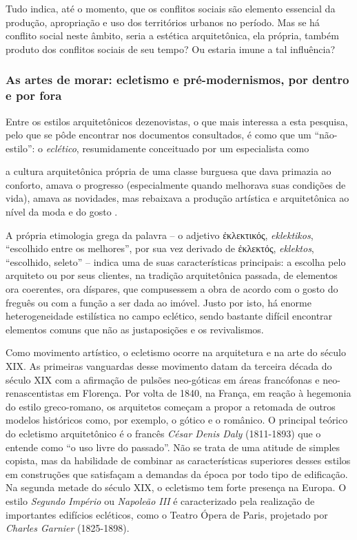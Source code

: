 Tudo indica, até o momento, que os conflitos sociais são elemento essencial da produção, apropriação e uso dos territórios urbanos no período. Mas se há conflito social neste âmbito, seria a estética arquitetônica, ela própria, também produto dos conflitos sociais de seu tempo? Ou estaria imune a tal influência?

\subsubsection{As artes de morar: ecletismo e pré-modernismos, por dentro e por fora}\label{subsec:armor}

Entre os estilos arquitetônicos dezenovistas, o que mais interessa a esta pesquisa, pelo que se pôde encontrar nos documentos consultados, é como que um ``não-estilo'': o \textit{eclético}, resumidamente conceituado por um especialista como

\begin{citacao}
a cultura arquitetônica própria de uma classe burguesa que dava primazia ao conforto, amava o progresso (especialmente quando melhorava suas condições de vida), amava as novidades, mas rebaixava a produção artística e arquitetônica ao nível da moda e do gosto \cite[p.~13]{patetta_ecletismo_1987}.
\end{citacao}

A própria etimologia grega da palavra -- o adjetivo \textgreek{ἐκλεκτικός}, \textit{eklektikos}, ``escolhido entre os melhores'', por sua vez derivado de \textgreek{ἐκλεκτός}, \textit{eklektos}, ``escolhido, seleto'' -- indica uma de suas características principais: a escolha pelo arquiteto ou por seus clientes, na tradição arquitetônica passada, de elementos ora coerentes, ora díspares, que compusessem a obra de acordo com o gosto do freguês ou com a função a ser dada ao imóvel. Justo por isto, há enorme heterogeneidade estilística no campo eclético, sendo bastante difícil encontrar elementos comuns que não as justaposições e os revivalismos. 

Como movimento artístico, o ecletismo ocorre na arquitetura e na arte do século XIX. As primeiras vanguardas desse movimento datam da terceira década do século XIX com a afirmação de pulsões neo-góticas em áreas francófonas e neo-renascentistas em Florença. Por volta de 1840, na França, em reação à hegemonia do estilo greco-romano, os arquitetos começam a propor a retomada de outros modelos históricos como, por exemplo, o gótico e o românico. O principal teórico do ecletismo arquitetônico é o francês \textit{César Denis Daly} (1811-1893) que o entende como ``o uso livre do passado''. Não se trata de uma atitude de simples copista, mas da habilidade de combinar as características superiores desses estilos em construções que satisfaçam a demandas da época por todo tipo de edificação. Na segunda metade do século XIX, o ecletismo tem forte presença na Europa. O estilo \textit{Segundo Império} ou \textit{Napoleão III} é caracterizado pela realização de importantes edifícios ecléticos, como o Teatro Ópera de Paris, projetado por \textit{Charles Garnier} (1825-1898).

